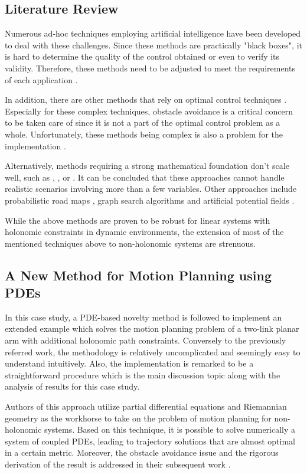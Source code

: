 \documentclass[letterpaper, 10 pt, conference]{ieeeconf}
\begin{document}
\subsection{Literature Review}

Numerous ad-hoc techniques employing artificial intelligence \cite{AI1} have been developed to deal with these challenges. Since these methods are practically "black boxes", it is hard to determine the quality of the control obtained or even to verify its validity. Therefore, these methods need to be adjusted to meet the requirements of each application \cite{AI2}. 

In addition, there are other methods that rely on optimal control techniques \cite{OC1}. Especially for these complex techniques, obstacle avoidance is a critical concern to be taken care of since it is not a part of the optimal control problem as a whole. Unfortunately, these methods being complex is also a problem for the implementation \cite{OC2}. 

Alternatively, methods requiring a strong mathematical foundation don't scale well, such as \cite{MATH1}, \cite{MATH2}, or \cite{MATH3}. It can be concluded that these approaches cannot handle realistic scenarios involving more than a few variables. Other approaches include probabilistic road maps \cite{PRM}, graph search algorithms \cite{GRAPH} and artificial potential fields \cite{APF}.

While the above methods are proven to be robust for linear systems with holonomic constraints in dynamic environments, the extension of most of the mentioned techniques above to non-holonomic systems are strenuous.

\subsection{A New Method for Motion Planning using PDEs}

In this case study, a PDE-based novelty method \cite{PAPER1} is followed to implement an extended example which solves the motion planning problem of a two-link planar arm with additional holonomic path constraints. Conversely to the previously referred work, the methodology is relatively uncomplicated and seemingly easy to understand intuitively. Also, the implementation is remarked to be a straightforward procedure which is the main discussion topic along with the analysis of results for this case study. 

Authors of this approach utilize partial differential equations and Riemannian geometry as the workhorse to take on the problem of motion planning for non-holonomic systems. Based on this technique, it is possible to solve numerically a system of coupled PDEs, leading to trajectory solutions that are almost optimal in a certain metric. Moreover, the obstacle avoidance issue and the rigorous derivation of the result is addressed in their subsequent work \cite{PAPER2}.
\end{document}
